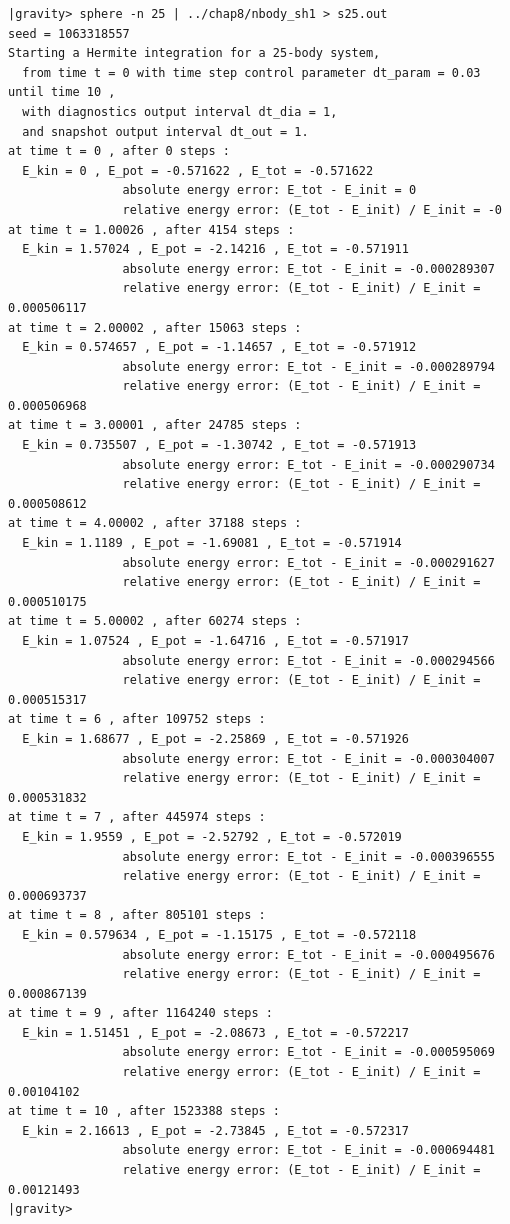 \begin{small}
\begin{verbatim}
|gravity> sphere -n 25 | ../chap8/nbody_sh1 > s25.out
seed = 1063318557
Starting a Hermite integration for a 25-body system,
  from time t = 0 with time step control parameter dt_param = 0.03  until time 10 ,
  with diagnostics output interval dt_dia = 1,
  and snapshot output interval dt_out = 1.
at time t = 0 , after 0 steps :
  E_kin = 0 , E_pot = -0.571622 , E_tot = -0.571622
                absolute energy error: E_tot - E_init = 0
                relative energy error: (E_tot - E_init) / E_init = -0
at time t = 1.00026 , after 4154 steps :
  E_kin = 1.57024 , E_pot = -2.14216 , E_tot = -0.571911
                absolute energy error: E_tot - E_init = -0.000289307
                relative energy error: (E_tot - E_init) / E_init = 0.000506117
at time t = 2.00002 , after 15063 steps :
  E_kin = 0.574657 , E_pot = -1.14657 , E_tot = -0.571912
                absolute energy error: E_tot - E_init = -0.000289794
                relative energy error: (E_tot - E_init) / E_init = 0.000506968
at time t = 3.00001 , after 24785 steps :
  E_kin = 0.735507 , E_pot = -1.30742 , E_tot = -0.571913
                absolute energy error: E_tot - E_init = -0.000290734
                relative energy error: (E_tot - E_init) / E_init = 0.000508612
at time t = 4.00002 , after 37188 steps :
  E_kin = 1.1189 , E_pot = -1.69081 , E_tot = -0.571914
                absolute energy error: E_tot - E_init = -0.000291627
                relative energy error: (E_tot - E_init) / E_init = 0.000510175
at time t = 5.00002 , after 60274 steps :
  E_kin = 1.07524 , E_pot = -1.64716 , E_tot = -0.571917
                absolute energy error: E_tot - E_init = -0.000294566
                relative energy error: (E_tot - E_init) / E_init = 0.000515317
at time t = 6 , after 109752 steps :
  E_kin = 1.68677 , E_pot = -2.25869 , E_tot = -0.571926
                absolute energy error: E_tot - E_init = -0.000304007
                relative energy error: (E_tot - E_init) / E_init = 0.000531832
at time t = 7 , after 445974 steps :
  E_kin = 1.9559 , E_pot = -2.52792 , E_tot = -0.572019
                absolute energy error: E_tot - E_init = -0.000396555
                relative energy error: (E_tot - E_init) / E_init = 0.000693737
at time t = 8 , after 805101 steps :
  E_kin = 0.579634 , E_pot = -1.15175 , E_tot = -0.572118
                absolute energy error: E_tot - E_init = -0.000495676
                relative energy error: (E_tot - E_init) / E_init = 0.000867139
at time t = 9 , after 1164240 steps :
  E_kin = 1.51451 , E_pot = -2.08673 , E_tot = -0.572217
                absolute energy error: E_tot - E_init = -0.000595069
                relative energy error: (E_tot - E_init) / E_init = 0.00104102
at time t = 10 , after 1523388 steps :
  E_kin = 2.16613 , E_pot = -2.73845 , E_tot = -0.572317
                absolute energy error: E_tot - E_init = -0.000694481
                relative energy error: (E_tot - E_init) / E_init = 0.00121493
|gravity> 
\end{verbatim}
\end{small}

